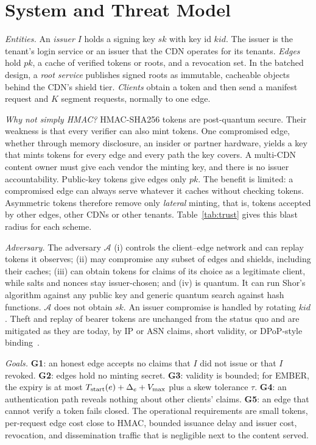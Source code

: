 \section{System and Threat Model}
\label{sec:threat}

\emph{Entities.} An \emph{issuer} $I$ holds a signing key $sk$ with key id $\mathit{kid}$. The issuer is the tenant's login service or an issuer that the CDN operates for its tenants. \emph{Edges} hold $pk$, a cache of verified tokens or roots, and a revocation set. In the batched design, a \emph{root service} publishes signed roots as immutable, cacheable objects behind the CDN's shield tier. \emph{Clients} obtain a token and then send a manifest request and $K$ segment requests, normally to one edge.

\emph{Why not simply HMAC?} HMAC-SHA256 tokens are post-quantum secure. Their weakness is that every verifier can also mint tokens. One compromised edge, whether through memory disclosure, an insider or partner hardware, yields a key that mints tokens for every edge and every path the key covers. A multi-CDN content owner must give each vendor the minting key, and there is no issuer accountability. Public-key tokens give edges only $pk$. The benefit is limited: a compromised edge can always serve whatever it caches without checking tokens. Asymmetric tokens therefore remove only \emph{lateral} minting, that is, tokens accepted by other edges, other CDNs or other tenants. Table~\ref{tab:trust} gives this blast radius for each scheme.

\emph{Adversary.} The adversary $\mathcal{A}$ (i) controls the client--edge network and can replay tokens it observes; (ii) may compromise any subset of edges and shields, including their caches; (iii) can obtain tokens for claims of its choice as a legitimate client, while salts and nonces stay issuer-chosen; and (iv) is quantum. It can run Shor's algorithm against any public key and generic quantum search against hash functions. $\mathcal{A}$ does not obtain $sk$. An issuer compromise is handled by rotating $\mathit{kid}$. Theft and replay of bearer tokens are unchanged from the status quo and are mitigated as they are today, by IP or ASN claims, short validity, or DPoP-style binding~\cite{rfc9449}.

\emph{Goals.} \textbf{G1}: an honest edge accepts no claims that $I$ did not issue or that $I$ revoked. \textbf{G2}: edges hold no minting secret. \textbf{G3}: validity is bounded; for EMBER, the expiry is at most $T_{\text{start}}(e)+\Delta_e+V_{\max}$ plus a skew tolerance $\tau$. \textbf{G4}: an authentication path reveals nothing about other clients' claims. \textbf{G5}: an edge that cannot verify a token fails closed. The operational requirements are small tokens, per-request edge cost close to HMAC, bounded issuance delay and issuer cost, revocation, and dissemination traffic that is negligible next to the content served.
